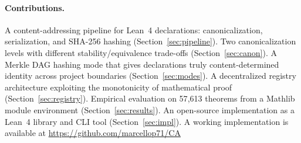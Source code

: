 \paragraph{Contributions.} A content-addressing pipeline for Lean~4 declarations:
canonicalization, serialization, and SHA-256 hashing (Section~\ref{sec:pipeline}).
Two canonicalization levels with different stability/equivalence trade-offs (Section~\ref{sec:canon}).
A Merkle DAG hashing mode that gives declarations truly content-determined identity across project boundaries (Section~\ref{sec:modes}).
A decentralized registry architecture exploiting the monotonicity of mathematical proof (Section~\ref{sec:registry}). Empirical evaluation on 57{,}613 theorems from a Mathlib
module environment (Section~\ref{sec:results}). An open-source implementation as a Lean~4 library and CLI tool (Section~\ref{sec:impl}). A working implementation
is available at \href{https://github.com/marcellop71/CA}{https://github.com/marcellop71/CA}


